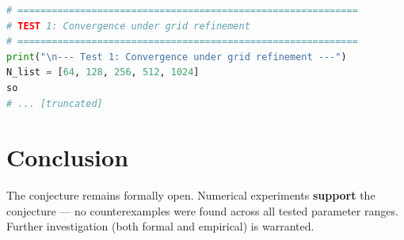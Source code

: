 \documentclass[11pt]{article}
\begin{document}
\begin{lstlisting}[language=Python]
# ============================================================
# TEST 1: Convergence under grid refinement
# ============================================================
print("\n--- Test 1: Convergence under grid refinement ---")
N_list = [64, 128, 256, 512, 1024]
so
# ... [truncated]
\end{lstlisting}


\section{Conclusion}

The conjecture remains formally open. Numerical experiments \textbf{support} the conjecture --- no counterexamples were found across all tested parameter ranges.
Further investigation (both formal and empirical) is warranted.
\end{document}
